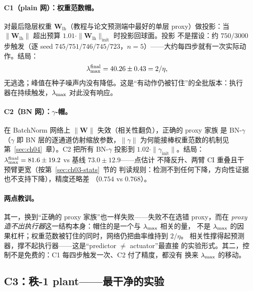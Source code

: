 \paragraph{C1（plain 网）：权重范数帽。}
对最后隐层权重 $\mathbf{W}_{\mathrm{lh}}$（教程与论文预测端中最好的单层
proxy）做投影：当 $\|\mathbf{W}_{\mathrm{lh}}\|$ 超出预算
$1.01\cdot\|\mathbf{W}_{\mathrm{lh}}\|_{\mathrm{init}}$ 时投影回球面。投影
不是摆设：约 $750/3000$ 步触发（逐 seed
$745/751/746/745/723$，$n{=}5$）——大约每四步就有一次实际动作。结局：
\[
  \lambda_{\max}^{\mathrm{final}}=40.26\pm0.43=2/\eta ,
\]
无逃逸；峰值在种子噪声内没有降低。这是``有动作仍被钉住''的全批版本：执行
器在持续触发，$\lambda_{\max}$ 对此没有响应。

\paragraph{C2（BN 网）：$\gamma$-帽。}
在 BatchNorm 网络上 $\|\mathbf{W}\|$ 失效（相关性翻负），正确的 proxy 家族
是 BN-$\gamma$（$\gamma$ 即 BN 层的逐通道仿射缩放参数，$\|\gamma\|$
为何能接棒权重范数的机制见第~\ref{sec:ch04}~章）。C2 把所有 BN-$\gamma$ 投影到
$1.02\cdot\|\gamma_{\mathrm{init}}\|$。结局：
$\lambda_{\max}^{\mathrm{final}}=81.6\pm19.2$ vs 基线 $73.0\pm12.9$——点估计
不降反升、两臂 CI 重叠且干预臂更宽（按第~\ref{sec:ch03-stats}~节的
判读规则：检测不到任何下降，方向性证据也不支持下降），精度还略差
（$0.754$ vs $0.768$）。

\paragraph{两点教训。}
其一，换到``正确的 proxy 家族''也一样失败——失败不在选错 proxy，而在
\emph{proxy 造不出执行器}这一结构本身：帽住的是一个与 $\lambda_{\max}$ 相关的量，
不是 $\lambda_{\max}$ 的因果杠杆；权重范数被钉住的同时，网络仍把曲率维持到 $2/\eta$。
相关性撑得起预测器，撑不起执行器——这是``predictor $\ne$ actuator''最直接
的实验形式。其二，控制不是免费的：C1 每四步触发一次、C2 付了精度，都没有
换来 $\lambda_{\max}$ 的移动。

\subsection{C3：秩-1 plant——最干净的实验}
\label{sec:ch05-rank1}

